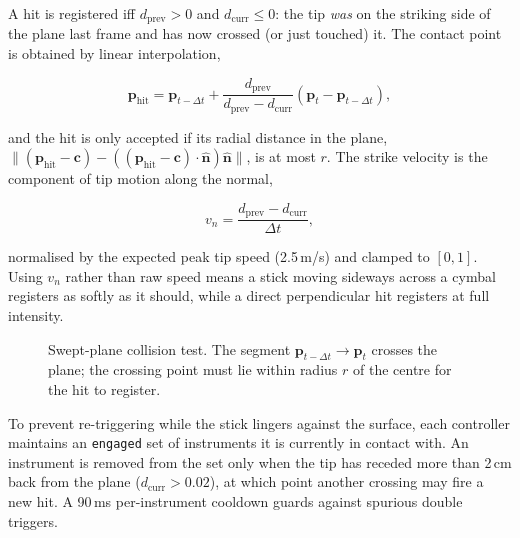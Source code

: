 \documentclass[11pt,a4paper]{article}
\begin{document}
A hit is registered iff $d_\text{prev}>0$ and $d_\text{curr}\leq 0$:
the tip \emph{was} on the striking side of the plane last frame and
has now crossed (or just touched) it. The contact point is obtained
by linear interpolation,

\[
\mathbf{p}_\text{hit} = \mathbf{p}_{t-\Delta t}
    + \frac{d_\text{prev}}{d_\text{prev}-d_\text{curr}}
      (\mathbf{p}_t - \mathbf{p}_{t-\Delta t}),
\]

and the hit is only accepted if its radial distance in the plane,
$\|(\mathbf{p}_\text{hit}-\mathbf{c})
    - ((\mathbf{p}_\text{hit}-\mathbf{c})\cdot\hat{\mathbf{n}})
      \hat{\mathbf{n}}\|$,
is at most $r$. The strike velocity is the component of tip motion
along the normal,

\[
v_n = \frac{d_\text{prev}-d_\text{curr}}{\Delta t},
\]

normalised by the expected peak tip speed (2.5\,m/s) and clamped to
$[0,1]$. Using $v_n$ rather than raw speed means a stick moving
sideways across a cymbal registers as softly as it should, while a
direct perpendicular hit registers at full intensity.

\begin{figure}[h]
\centering
{}
\caption{Swept-plane collision test. The segment
$\mathbf{p}_{t-\Delta t}\to\mathbf{p}_t$ crosses the plane; the
crossing point must lie within radius $r$ of the centre for the hit
to register.}
\label{fig:collision}
\end{figure}

To prevent re-triggering while the stick lingers against the surface,
each controller maintains an \texttt{engaged} set of instruments it
is currently in contact with. An instrument is removed from the set
only when the tip has receded more than 2\,cm back from the plane
($d_\text{curr}>0.02$), at which point another crossing may fire a
new hit. A 90\,ms per-instrument cooldown guards against spurious
double triggers.
\end{document}
